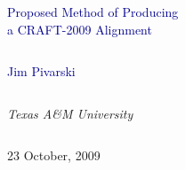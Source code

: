 \documentclass[compress]{beamer}
\begin{document}
\begin{frame}
\vfill
\begin{center}
\textcolor{darkblue}{\Large Proposed Method of Producing \\ \vspace{0.2 cm} a CRAFT-2009 Alignment}

\vfill
\begin{columns}
\begin{center}
\large
\textcolor{darkblue}{Jim Pivarski}
\end{center}
\end{columns}

\begin{columns}
\begin{center}
\scriptsize
{\it Texas A\&M University}
\end{center}
\end{columns}

\vfill
23 October, 2009

\end{center}
\end{frame}


\small
\end{document}
